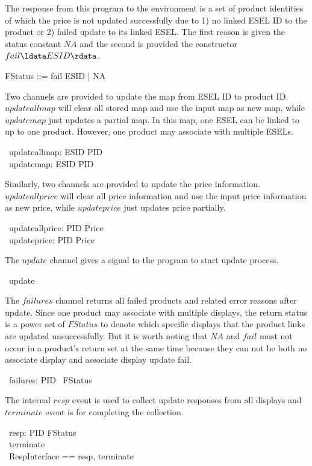 The response from this program to the environment is a set of product identities of which the price is not updated successfully due to 1) no linked ESEL ID to the product or 2) failed update to its linked ESEL. The first reason is given the status constant $NA$ and the second is provided the constructor $fail\ldata ESID \rdata$.
\begin{zed}
    FStatus ::= fail \ldata ESID \rdata | NA 
\end{zed}

Two channels are provided to update the map from ESEL ID to product ID. $updateallmap$ will clear all stored map and use the input map as new map, while $updatemap$ just updates a partial map. In this map, one ESEL can be linked to up to one product. However, one product may associate with multiple ESELs. 
\begin{circus}
	\circchannel\ updateallmap: ESID \pfun PID \\
	\circchannel\ updatemap: ESID \pfun PID
\end{circus}

Similarly, two channels are provided to update the price information. $updateallprice$ will clear all price information and use the input price information as new price, while $updateprice$ just updates price partially.  
\begin{circus}
	\circchannel\ updateallprice: PID \pfun Price \\
	\circchannel\ updateprice: PID \pfun Price
\end{circus}

The $update$ channel gives a signal to the program to start update process.
\begin{circus}
	\circchannel\ update
\end{circus}

The $failures$ channel returns all failed products and related error reasons after update. Since one product may associate with multiple displays, the return status is a power set of $FStatus$ to denote which specific displays that the product links are updated unsuccessfully. But it is worth noting that $NA$ and $fail$ must not occur in a product's return set at the same time because they can not be both no associate display and associate display update fail.
\begin{circus}
	\circchannel\ failures: PID \pfun \power~FStatus 
\end{circus}

The internal $resp$ event is used to collect update responses from all displays and $terminate$ event is for completing the collection.
\begin{circus}
	\circchannel\ resp: PID \cross FStatus \\
    \circchannel\ terminate \\
    \circchannelset\ RespInterface == \lchanset resp, terminate \rchanset 
\end{circus}

